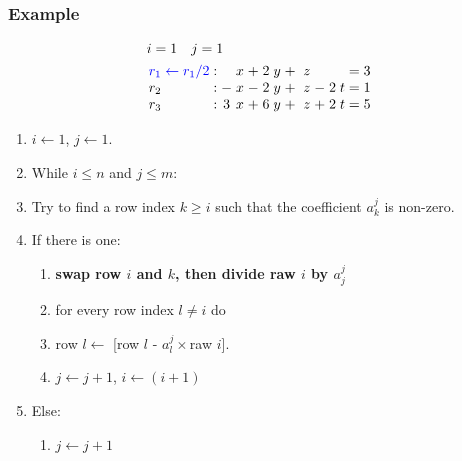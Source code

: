 \documentclass{beamer}
\begin{document}
\begin{frame}
  \frametitle{Example}
  
  \[\arraycolsep=1.4pt
  \begin{aligned}
    &i = 1 \quad j = 1 \\
      &
    \begin{array}{lcccccccccccccc}
        {\color{blue} r_1 \leftarrow r_1/2} & : &  & x & + & 2 & y & + &  & z &  & & & = & 3\\
        r_2 & : & - & x & - & 2 & y & + & & z & - & 2 & t & = & 1\\
        r_3 & : & 3 & x & + & 6 & y & + & & z & + & 2 & t & = & 5\\
    \end{array}
    \end{aligned}
  \]
  
  
  \begin{enumerate}
  \item $i \leftarrow 1$, $j \leftarrow 1$.
  \item While $i \le n$ and $j \le m$:
  \item Try to find a row index $k \ge i$ such that the coefficient $a^j_k$ is non-zero.
  \item If there is one:
    \begin{enumerate}
    \item {\bf swap row $i$ and $k$, then divide raw $i$ by $a^{j}_j$}
    \item for every row index $l \neq i$ do 
    \item row $l \leftarrow$ [row $l$ - $a^j_l\times$raw $i$].
    \item $j \leftarrow j+1$, $i \leftarrow (i+1)$
    \end{enumerate}
  \item Else:
    \begin{enumerate}
    \item $j \leftarrow j+1$
    \end{enumerate}
  \end{enumerate}
  
\end{frame}
\end{document}
